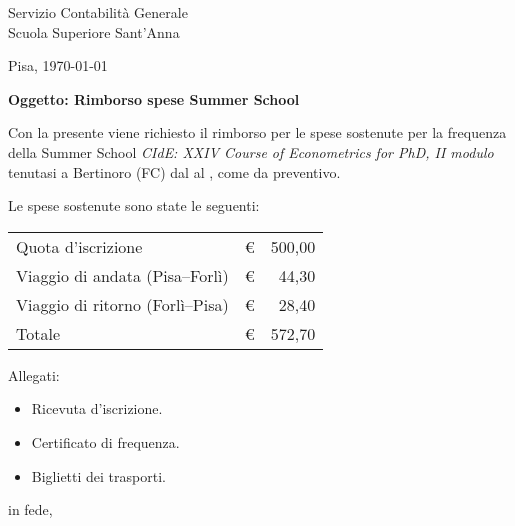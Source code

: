 \documentclass[11pt,a4paper]{letter}
\date{}
\begin{document}
 
\begin{letter}{Servizio Contabilità Generale\\Scuola Superiore Sant'Anna} 

Pisa, \today

\opening{\textbf{Oggetto: Rimborso spese Summer School}}

Con la presente viene richiesto il rimborso per le spese sostenute per la frequenza della Summer School  \emph{CIdE: XXIV Course of Econometrics for PhD, II modulo} tenutasi a Bertinoro (FC) dal  al , come da preventivo.

Le spese sostenute sono state le seguenti:

\begin{center}
\begin{tabular}{lrr}
\toprule
Quota d'iscrizione              & € & 500,00 \\
Viaggio di andata (Pisa–Forlì)  & € &  44,30 \\
Viaggio di ritorno (Forlì–Pisa) & € &  28,40 \\
\midrule
Totale                          & € & 572,70 \\
\bottomrule
\end{tabular}
\end{center}

Allegati:
\begin{itemize}
\item Ricevuta d'iscrizione.
\item Certificato di frequenza.
\item Biglietti dei trasporti.
\end{itemize}


\bigskip
\closing{in fede,\\
 \\
}
\vfill
\nonumber

\end{letter} 
\end{document}
